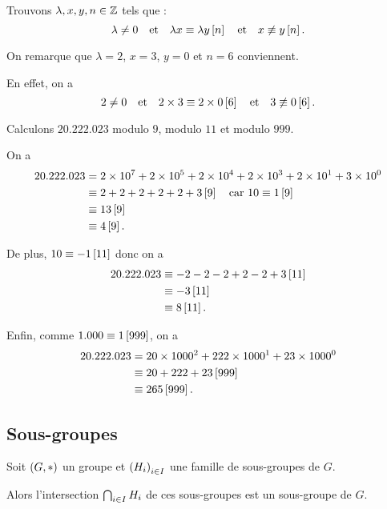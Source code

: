 \begin{ex}
Trouvons \(\lambda,x,y,n\in\mathbb{Z}\) tels que : \[\lambda\not=0\quad\text{et}\quad\lambda x\equiv\lambda y\left[n\right]\quad\text{et}\quad x\not\equiv y\left[n\right].\]

On remarque que \(\lambda=2\), \(x=3\), \(y=0\) et \(n=6\) conviennent.

En effet, on a \[2\not=0\quad\text{et}\quad2\times3\equiv2\times0\left[6\right]\quad\text{et}\quad3\not\equiv0\left[6\right].\]
\end{ex}

\begin{ex}
Calculons \(20.222.023\) modulo \(9\), modulo \(11\) et modulo \(999\).

On a \[\begin{aligned}
20.222.023&=2\times 10^{7}+2\times 10^{5}+2\times 10^{4}+2\times 10^{3}+2\times 10^{1}+3\times 10^{0} \\
&\equiv2+2+2+2+2+3\left[9\right]\quad\text{car }10\equiv1\left[9\right] \\
&\equiv13\left[9\right] \\
&\equiv4\left[9\right].
\end{aligned}\]

De plus, \(10\equiv-1\left[11\right]\) donc on a \[\begin{aligned}
20.222.023&\equiv-2-2-2+2-2+3\left[11\right] \\
&\equiv-3\left[11\right] \\
&\equiv8\left[11\right].
\end{aligned}\]

Enfin, comme \(1.000\equiv1\left[999\right]\), on a \[\begin{aligned}
20.222.023&=20\times1000^2+222\times1000^1+23\times1000^0 \\
&\equiv20+222+23\left[999\right] \\
&\equiv265\left[999\right].
\end{aligned}\]
\end{ex}

\subsection{Sous-groupes}

\begin{prop}
Soit \(\left(G,*\right)\) un groupe et \(\left(H_i\right)_{i\in I}\) une famille de sous-groupes de \(G\).

Alors l'intersection \(\bigcap_{i\in I}H_i\) de ces sous-groupes est un sous-groupe de \(G\).
\end{prop}

